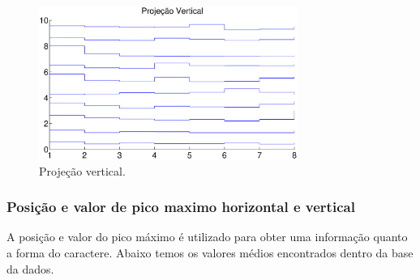 \documentclass[letterpaper, 10 pt, conference]{ieeeconf}  %
\begin{document}
\begin{figure}[H]
\centering
\includegraphics[height=5cm]{imagens/projecaoVertical.eps}
\caption{Projeção vertical.}
\label{fig:pv}
\end{figure}

\subsubsection{Posição e valor de pico maximo horizontal e vertical}
A posição e valor do pico máximo é utilizado para obter uma informação quanto a
forma do caractere. Abaixo temos os valores médios encontrados dentro da base da
dados.
\end{document}
